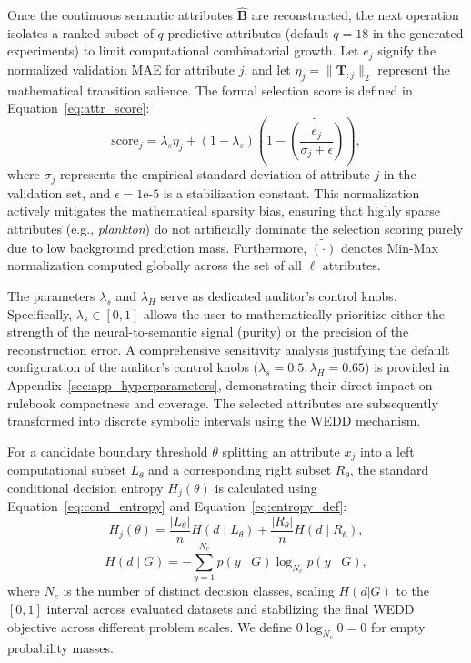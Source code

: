 \documentclass[make,article,submit,pdftex,moreauthors]{Definitions/mdpi}
\newcommand{\hatB}{\widehat{\mathbf{B}}}
\newcommand{\matT}{\mathbf{T}}
\begin{document}
Once the continuous semantic attributes $\hatB$ are reconstructed, the next operation isolates a ranked subset of $q$ predictive attributes (default $q=18$ in the generated experiments) to limit computational combinatorial growth. Let $e_j$ signify the normalized validation MAE for attribute $j$, and let $\eta_j = \|\matT_{:j}\|_2$ represent the mathematical transition salience. The formal selection score is defined in Equation~\eqref{eq:attr_score}:
\begin{equation}
 \label{eq:attr_score}
 \mathrm{score}_j = \lambda_s\widetilde{\eta}_j + (1-\lambda_s)\left(1 - \widetilde{\left(\frac{e_j}{\sigma_j + \epsilon}\right)}\right),
\end{equation}
where $\sigma_j$ represents the empirical standard deviation of attribute $j$ in the validation set, and $\epsilon=1\text{e-}5$ is a stabilization constant. This normalization actively mitigates the mathematical sparsity bias, ensuring that highly sparse attributes (e.g., \textit{plankton}) do not artificially dominate the selection scoring purely due to low background prediction mass. Furthermore, $\widetilde{(\cdot)}$ denotes Min-Max normalization computed globally across the set of all $\ell$ attributes. 

The parameters $\lambda_s$ and $\lambda_H$ serve as dedicated auditor's control knobs. Specifically, $\lambda_s \in [0,1]$ allows the user to mathematically prioritize either the strength of the neural-to-semantic signal (purity) or the precision of the reconstruction error. A comprehensive sensitivity analysis justifying the default configuration of the auditor's control knobs ($\lambda_s = 0.5, \lambda_H = 0.65$) is provided in Appendix~\ref{sec:app_hyperparameters}, demonstrating their direct impact on rulebook compactness and coverage. The selected attributes are subsequently transformed into discrete symbolic intervals using the WEDD mechanism. 

For a candidate boundary threshold $\theta$ splitting an attribute $x_j$ into a left computational subset $L_\theta$ and a corresponding right subset $R_\theta$, the standard conditional decision entropy $H_j(\theta)$ is calculated using Equation~\eqref{eq:cond_entropy} and Equation~\eqref{eq:entropy_def}:
\begin{equation}
 \label{eq:cond_entropy}
 H_j(\theta) = \frac{|L_\theta|}{n}H(d\mid L_\theta) + \frac{|R_\theta|}{n}H(d\mid R_\theta),
\end{equation}
\begin{equation}
 \label{eq:entropy_def}
 H(d\mid G) = -\sum_{y=1}^{N_c}p(y\mid G)\log_{N_c} p(y\mid G),
\end{equation}
where $N_c$ is the number of distinct decision classes, scaling $H(d|G)$ to the $[0,1]$ interval across evaluated datasets and stabilizing the final WEDD objective across different problem scales. We define $0 \log_{N_c} 0 = 0$ for empty probability masses.
\end{document}
